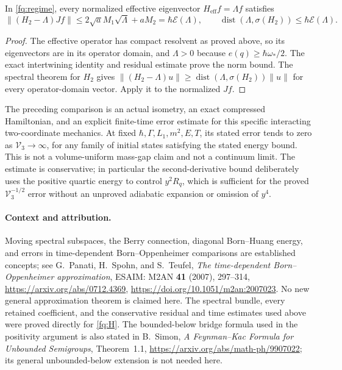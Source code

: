 \begin{corollary}
\label{fq:spectral-error}
In \eqref{fq:regime}, every normalized effective eigenvector
$H_{\mathrm{eff}}f=\Lambda f$ satisfies
\[
 \|(H_2-\Lambda)Jf\|\leq
       2\sqrt aM_1\sqrt\Lambda+aM_2
       =\hbar\mathcal E(\Lambda),\qquad
 \operatorname{dist}(\Lambda,\sigma(H_2))
       \leq\hbar\mathcal E(\Lambda).
\]
\end{corollary}
\begin{proof}
The effective operator has compact resolvent as proved above, so
its eigenvectors are in its operator domain, and $\Lambda>0$
because $e(q)\geq\hbar\omega_*/2$. The exact intertwining identity
and residual estimate prove the norm bound. The spectral theorem
for $H_2$ gives
$\|(H_2-\Lambda)u\|\geq\operatorname{dist}(\Lambda,\sigma(H_2))\|u\|$
for every operator-domain vector. Apply it to the normalized $Jf$.
\end{proof}

The preceding comparison is an actual isometry, an exact compressed
Hamiltonian, and an explicit finite-time error estimate for this
specific interacting two-coordinate mechanics. At fixed
$\hbar,\Gamma,L_1,m^2,E,T$, its stated error tends to zero as
$\mathcal V_3\to\infty$, for any family of initial states satisfying
the stated energy bound. This is not a volume-uniform mass-gap
claim and not a continuum limit. The estimate is conservative;
in particular the second-derivative bound deliberately uses the
positive quartic energy to control $y^2R_q$, which is sufficient
for the proved $\mathcal V_3^{-1/2}$ error without an unproved
adiabatic expansion or omission of $y^4$.

\paragraph{Context and attribution.}
Moving spectral subspaces, the Berry connection, diagonal
Born--Huang energy, and errors in time-dependent Born--Oppenheimer
comparisons are established concepts; see G.~Panati, H.~Spohn,
and S.~Teufel, \emph{The time-dependent Born--Oppenheimer approximation},
ESAIM: M2AN \textbf{41} (2007), 297--314,
\url{https://arxiv.org/abs/0712.4369},
\url{https://doi.org/10.1051/m2an:2007023}.
No new general approximation theorem is claimed here. The spectral
bundle, every retained coefficient, and the conservative residual
and time estimates used above were proved directly for
\eqref{fq:H}. The bounded-below bridge formula used in the positivity
argument is also stated in B.~Simon, \emph{A Feynman--Kac Formula for
Unbounded Semigroups}, Theorem~1.1,
\url{https://arxiv.org/abs/math-ph/9907022}; its general unbounded-below
extension is not needed here.
